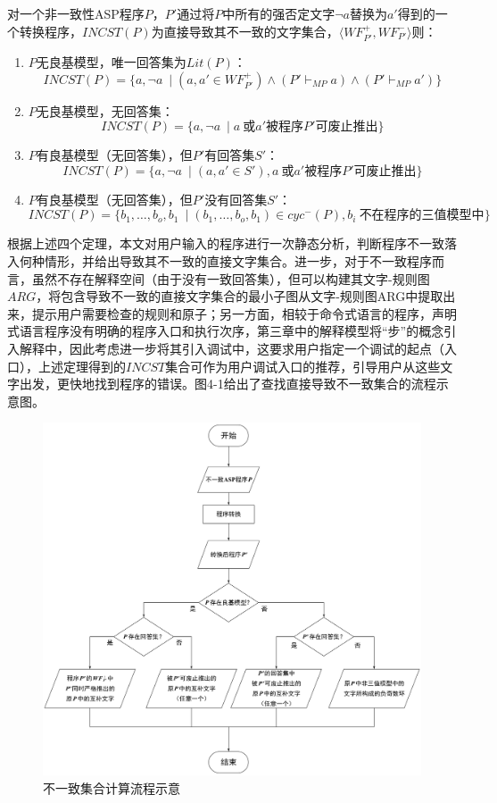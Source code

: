 \begin{theorem}
    \label{thm:incstlit}
    对一个非一致性ASP程序$P$，$P'$通过将$P$中所有的强否定文字$\lnot a$替换为$a'$得到的一个转换程序，$INCST(P)$为直接导致其不一致的文字集合，$\langle WF^+_{P'}, WF^-_{P'} \rangle$则：
    \begin{enumerate}[itemsep=0pt, label=(\arabic*)]
        \item $P$无良基模型，唯一回答集为$Lit(P)$：
        $$INCST(P)=\{a, \lnot a\ \mid (a, a' \in WF^+_{P'}) \land (P' \vdash_{MP} a) \land (P' \vdash_{MP} a')\}$$
        \item $P$无良基模型，无回答集：
        $$INCST(P)=\{a, \lnot a\ \mid a\ \text{或} a' \text{被程序} P' \text{可废止推出}\}$$
        \item $P$有良基模型（无回答集），但$P'$有回答集$S'$：
        $$INCST(P)=\{a, \lnot a\ \mid (a, a' \in S'), a\ \text{或} a' \text{被程序} P' \text{可废止推出}\}$$
        \item $P$有良基模型（无回答集），但$P'$没有回答集$S'$：
        $$INCST(P)=\{b_1, \ldots, b_o, b_1\ \mid (b_1, \ldots, b_o, b_1) \in cyc^-(P), b_i\ \text{不在程序的三值模型中}\}$$
    \end{enumerate}
\end{theorem}

根据上述四个定理，本文对用户输入的程序进行一次静态分析，判断程序不一致落入何种情形，并给出导致其不一致的直接文字集合。进一步，对于不一致程序而言，虽然不存在解释空间（由于没有一致回答集），但可以构建其文字-规则图$ARG$，将包含导致不一致的直接文字集合的最小子图从文字-规则图ARG中提取出来，提示用户需要检查的规则和原子；另一方面，相较于命令式语言的程序，声明式语言程序没有明确的程序入口和执行次序，第三章中的解释模型将“步”的概念引入解释中，因此考虑进一步将其引入调试中，这要求用户指定一个调试的起点（入口），上述定理得到的$INCST$集合可作为用户调试入口的推荐，引导用户从这些文字出发，更快地找到程序的错误。图4-1给出了查找直接导致不一致集合的流程示意图。
\begin{figure}[htbp]
    \centering
    \includegraphics[height=.8\textwidth, valign=c]{figures/不一致集合计算.jpg}
    \caption{不一致集合计算流程示意}
\end{figure}

